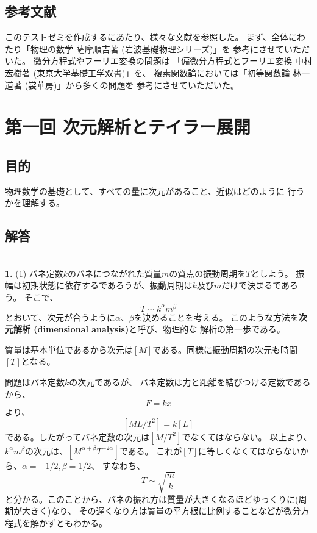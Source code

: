 \documentclass{jarticle}
\newcommand{\ans}[2]{\noindent\\ {\bf \large #1.} (#2)}
\begin{document}
\subsection{参考文献}

このテストゼミを作成するにあたり、様々な文献を参照した。
まず、全体にわたり「物理の数学 薩摩順吉著 (岩波基礎物理シリーズ)」を
参考にさせていただいた。
微分方程式やフーリエ変換の問題は
「偏微分方程式とフーリエ変換 中村宏樹著 (東京大学基礎工学双書)」を、
複素関数論においては「初等関数論 林一道著 (裳華房)」から多くの問題を
参考にさせていただいた。

\newpage
\section{第一回 次元解析とテイラー展開}

\subsection{目的}
物理数学の基礎として、すべての量に次元があること、近似はどのように
行うかを理解する。

\subsection{解答}

\ans{1}{1}
バネ定数$k$のバネにつながれた質量$m$の質点の振動周期を$T$としよう。
振幅は初期状態に依存するであろうが、振動周期は$k$及び$m$だけで決まるであろう。
そこで、
$$
  T \sim k^{\alpha} m^{\beta}
$$
とおいて、次元が合うように$\alpha$、$\beta$を決めることを考える。
このような方法を{\bf 次元解析 (dimensional analysis)}と呼び、物理的な
解析の第一歩である。

質量は基本単位であるから次元は$[M]$である。同様に振動周期の次元も時間$[T]$となる。

問題はバネ定数$k$の次元であるが、
バネ定数は力と距離を結びつける定数であるから、
$$
  F = k x
$$
より、
$$
  [M L/T^2] = k[L]
$$
である。したがってバネ定数の次元は$[M/T^2]$でなくてはならない。
以上より、$k^\alpha m^\beta$の次元は、$[M^{\alpha+\beta} T^{-2\alpha}]$である。
これが$[T]$に等しくなくてはならないから、$\alpha = -1/2, \beta = 1/2$、
すなわち、
$$
  T \sim \sqrt{\frac{m}{k}}
$$
と分かる。このことから、バネの振れ方は質量が大きくなるほどゆっくりに(周期が大きく)なり、
その遅くなり方は質量の平方根に比例することなどが微分方程式を解かずともわかる。
\end{document}
